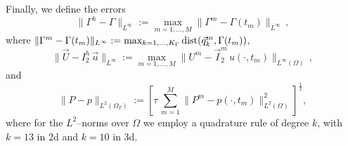 \documentclass[a4paper,11pt,onecolumn]{article}
\newcommand{\errorXx}{\|\Gamma^h - \Gamma\|_{L^\infty}}
\newcommand{\errorUu}[1]{\|\vec U - I^h_{#1}\,\vec u\|_{L^\infty}}
\newcommand{\LerrorPp}{\|P - p\|_{L^2(\Omega_T)}}
\begin{document}
Finally, we define the errors
\begin{equation} \label{eq:errorXx}
\errorXx := \max_{m=1,\ldots, M} \|\Gamma^m - \Gamma(t_m)\|_{L^\infty}\,,
\end{equation}
where $\|\Gamma^m - \Gamma(t_m)\|_{L^\infty} :=
\max_{k=1,\ldots, K_\Gamma} {\rm dist}( \vec{q}^m_k, \Gamma(t_m))$,
\begin{equation*}
\errorUu2 := \max_{m=1,\ldots, M}\|U^m
- \vec I^m_2\,u(\cdot,t_m)\|_{L^\infty(\Omega)}\,,
\end{equation*}
and
\begin{equation*}
\LerrorPp := \left[\tau\,\sum_{m=1}^M \|P^m - p(\cdot,t_m)\|_{L^2(\Omega)}^2
\right]^\frac12 ,
\end{equation*}
where for the $L^2$--norms over $\Omega$ we employ a quadrature rule of degree
$k$, with $k=13$ in 2d and $k=10$ in 3d.
\end{document}
